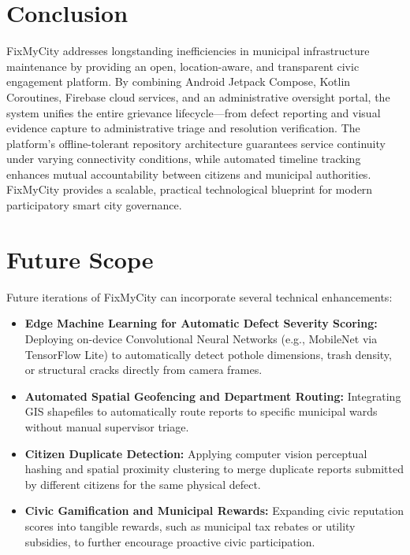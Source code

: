 \documentclass[conference]{IEEEtran}
\begin{document}
\section{Conclusion}

FixMyCity addresses longstanding inefficiencies in municipal infrastructure maintenance by providing an open, location-aware, and transparent civic engagement platform. By combining Android Jetpack Compose, Kotlin Coroutines, Firebase cloud services, and an administrative oversight portal, the system unifies the entire grievance lifecycle---from defect reporting and visual evidence capture to administrative triage and resolution verification. The platform's offline-tolerant repository architecture guarantees service continuity under varying connectivity conditions, while automated timeline tracking enhances mutual accountability between citizens and municipal authorities. FixMyCity provides a scalable, practical technological blueprint for modern participatory smart city governance.

\section{Future Scope}

Future iterations of FixMyCity can incorporate several technical enhancements:
\begin{itemize}
    \item \textbf{Edge Machine Learning for Automatic Defect Severity Scoring:} Deploying on-device Convolutional Neural Networks (e.g., MobileNet via TensorFlow Lite) to automatically detect pothole dimensions, trash density, or structural cracks directly from camera frames.
    \item \textbf{Automated Spatial Geofencing and Department Routing:} Integrating GIS shapefiles to automatically route reports to specific municipal wards without manual supervisor triage.
    \item \textbf{Citizen Duplicate Detection:} Applying computer vision perceptual hashing and spatial proximity clustering to merge duplicate reports submitted by different citizens for the same physical defect.
    \item \textbf{Civic Gamification and Municipal Rewards:} Expanding civic reputation scores into tangible rewards, such as municipal tax rebates or utility subsidies, to further encourage proactive civic participation.
\end{itemize}
\end{document}
